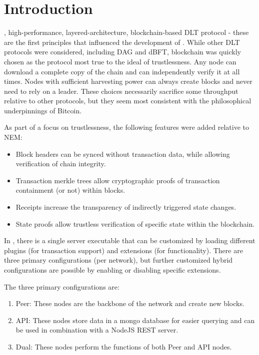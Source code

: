 \section{Introduction}
\label{sec:introduction}


, high-performance, layered-architecture, blockchain-based DLT protocol - these are the first principles that influenced the development of \codename.
While other DLT protocols were considered, including DAG and dBFT, blockchain was quickly chosen as the protocol most true to the ideal of trustlessness.
Any node can download a complete copy of the chain and can independently verify it at all times.
Nodes with sufficient harvesting power can always create blocks and never need to rely on a leader.
These choices necessarily sacrifice some throughput relative to other protocols, but they seem most consistent with the philosophical underpinnings of Bitcoin\cite{nakamoto2009}.

As part of a focus on trustlessness, the following features were added relative to NEM:
\begin{itemize}
	\item{Block headers can be synced without transaction data, while allowing verification of chain integrity.}
	\item{Transaction merkle trees allow cryptographic proofs of transaction containment (or not) within blocks.}
	\item{Receipts increase the transparency of indirectly triggered state changes.}
	\item{State proofs allow trustless verification of specific state within the blockchain.}
\end{itemize}

In \codename, there is a single server executable that can be customized by loading different plugins (for transaction support) and extensions (for functionality).
There are three primary configurations (per network), but further customized hybrid configurations are possible by enabling or disabling specific extensions.

The three primary configurations are:
\begin{enumerate}
	\item{Peer: These nodes are the backbone of the network and create new blocks.}
	\item{API: These nodes store data in a mongo database for easier querying and can be used in combination with a NodeJS REST server.}
	\item{Dual: These nodes perform the functions of both Peer and API nodes.}
\end{enumerate}

